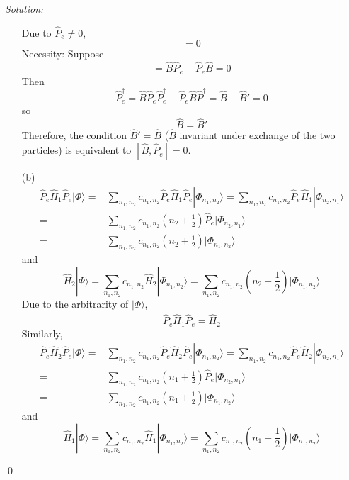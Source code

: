 \documentclass[12pt,a4paper]{article}
\newenvironment{sol}
    {\emph{Solution:}
    }
    {
    \qed
    }
\begin{document}
\begin{sol}
\begin{itemize}
Due to $\hat{P}_e\neq0$,
\begin{equation}
[\hat{B},\hat{P}_e]=0
\end{equation}
Necessity: Suppose
\begin{equation}
[\hat{B},\hat{P}_e]=\hat{B}\hat{P}_e-\hat{P}_e\hat{B}=0
\end{equation}
Then
\begin{equation}
[\hat{B},\hat{P}_e]\hat{P}_e^{\dagger}=\hat{B}\hat{P}_e\hat{P}_e^{\dagger}-\hat{P}_e\hat{B}\hat{P}^{\dagger}=\hat{B}-\hat{B}'=0
\end{equation}
so
\begin{equation}
\hat{B}=\hat{B}'
\end{equation}
Therefore, the condition $\hat{B}'=\hat{B}$ ($\hat{B}$ invariant under exchange of the two particles) is equivalent to $[\hat{B},\hat{P}_e]=0$.
\item[(b)]
\begin{align}
\nonumber\hat{P}_e\hat{H}_1\hat{P}_e|\Phi\rangle=&\sum_{n_1,n_2}c_{n_1,n_2}\hat{P}_e\hat{H}_1\hat{P}_e|\Phi_{n_1,n_2}\rangle=\sum_{n_1,n_2}c_{n_1,n_2}\hat{P}_e\hat{H}_1|\Phi_{n_2,n_1}\rangle\\
\nonumber=&\sum_{n_1,n_2}c_{n_1,n_2}(n_2+\frac{1}{2})\hat{P}_e|\Phi_{n_2,n_1}\rangle\\
=&\sum_{n_1,n_2}c_{n_1,n_2}(n_2+\frac{1}{2})|\Phi_{n_1,n_2}\rangle
\end{align}
and
\begin{equation}
\hat{H}_2|\Phi\rangle=\sum_{n_1,n_2}c_{n_1,n_2}\hat{H}_2|\Phi_{n_1,n_2}\rangle=\sum_{n_1,n_2}c_{n_1,n_2}(n_2+\frac{1}{2})|\Phi_{n_1,n_2}\rangle
\end{equation}
Due to the arbitrarity of $|\Phi\rangle$,
\begin{equation}
\hat{P}_e\hat{H}_1\hat{P}_e^{\dagger}=\hat{H}_2
\end{equation}
Similarly,
\begin{align}
\nonumber\hat{P}_e\hat{H}_2\hat{P}_e|\Phi\rangle=&\sum_{n_1,n_2}c_{n_1,n_2}\hat{P}_e\hat{H}_2\hat{P}_e|\Phi_{n_1,n_2}\rangle=\sum_{n_1,n_2}c_{n_1,n_2}\hat{P}_e\hat{H}_2|\Phi_{n_2,n_1}\rangle\\
\nonumber=&\sum_{n_1,n_2}c_{n_1,n_2}(n_1+\frac{1}{2})\hat{P}_e|\Phi_{n_2,n_1}\rangle\\
=&\sum_{n_1,n_2}c_{n_1,n_2}(n_1+\frac{1}{2})|\Phi_{n_1,n_2}\rangle
\end{align}
and
\begin{equation}
\hat{H}_1|\Phi\rangle=\sum_{n_1,n_2}c_{n_1,n_2}\hat{H}_1|\Phi_{n_1,n_2}\rangle=\sum_{n_1,n_2}c_{n_1,n_2}(n_1+\frac{1}{2})|\Phi_{n_1,n_2}\rangle

\end{equation}
\end{itemize}
\end{sol}
\end{document}
